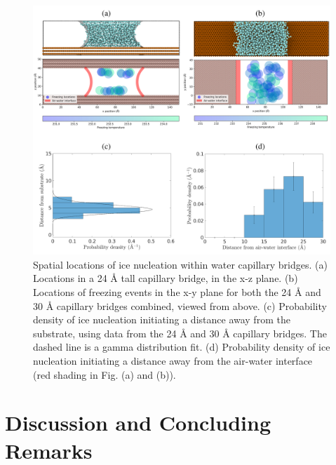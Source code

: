 \documentclass[journal abbreviation, manuscript]{copernicus}
\begin{document}
\begin{figure}[t]
\includegraphics[width=12cm]{figures/freezing_locations_distributions.png}
\caption{Spatial locations of ice nucleation within water capillary bridges. (a) Locations in a 24 \AA{} tall capillary bridge, in the x-z plane. (b) Locations of freezing events in the x-y plane for both the 24 \AA{} and 30 \AA{} capillary bridges combined, viewed from above. (c) Probability density of ice nucleation initiating a distance away from the substrate, using data from the 24 \AA{} and 30 \AA{} capillary bridges. The dashed line is a gamma distribution fit. (d) Probability density of ice nucleation initiating a distance away from the air-water interface (red shading in Fig. (a) and (b)).\label{fig:freezinglocations}}
\end{figure}


\section{Discussion and Concluding Remarks}
\end{document}
